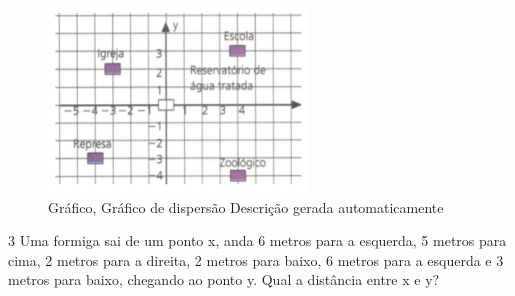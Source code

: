 \begin{escolha}
\begin{boxmedio}
\begin{boxmedio}
{\begin{boxpeq}
\begin{boxpeq}
{\begin{boxpeq}
\begin{boxmedio}
\begin{boxmedio}
\begin{boxpeq}
\begin{boxmedio}
\begin{boxpeq}
\begin{boxpeq}
\begin{boxpeq}
\begin{boxpeq}
\begin{boxmedio}
{\begin{boxmedio}
\begin{boxmedio}
\begin{boxpeq}
\begin{boxmedio}
\begin{boxpeq}
\begin{boxpeq}
\begin{boxpeq}
\begin{escolha}
{\begin{boxmedio}
\begin{boxpeq}
\begin{boxpeq}
\begin{boxpeq}
\begin{boxpeq}
\begin{boxpeq}
\begin{boxmedio}
\begin{boxpeq}
\begin{boxpeq}
\begin{boxpeq}
{\begin{boxpeq}
\begin{boxmedio}
\begin{boxpeq}
\begin{boxpeq}
\begin{boxpeq}
{\begin{boxpeq}
\begin{boxmedio}
{\begin{boxpeq}
\begin{boxpeq}
\begin{boxmedio}
\begin{boxmedio}
\begin{boxpeq}
\begin{boxpeq}
{\begin{boxpeq}
\begin{boxpeq}
\begin{figure}
\centering
\includegraphics[width=2.7in,height=1.92673in]{./_SAEB_9_MAT/media/image165.png}
\caption{Gráfico, Gráfico de dispersão Descrição gerada automaticamente}
\end{figure}


\begin{boxpeq}


\num{3} Uma formiga sai de um ponto x, anda 6 metros para a esquerda, 5
metros para cima, 2 metros para a direita, 2 metros para baixo, 6 metros
para a esquerda e 3 metros para baixo, chegando ao ponto y. Qual a
distância entre x e y?

\begin{boxpeq}


\end{boxpeq}
\end{boxpeq}
\end{boxpeq}
\end{boxpeq}}
\end{boxpeq}
\end{boxpeq}
\end{boxmedio}
\end{boxmedio}
\end{boxpeq}
\end{boxpeq}}
\end{boxmedio}
\end{boxpeq}}
\end{boxpeq}
\end{boxpeq}
\end{boxpeq}
\end{boxmedio}
\end{boxpeq}}
\end{boxpeq}
\end{boxpeq}
\end{boxpeq}
\end{boxmedio}
\end{boxpeq}
\end{boxpeq}
\end{boxpeq}
\end{boxpeq}
\end{boxpeq}
\end{boxmedio}}
\end{escolha}
\end{boxpeq}
\end{boxpeq}
\end{boxpeq}
\end{boxmedio}
\end{boxpeq}
\end{boxmedio}
\end{boxmedio}}
\end{boxmedio}
\end{boxpeq}
\end{boxpeq}
\end{boxpeq}
\end{boxpeq}
\end{boxmedio}
\end{boxpeq}
\end{boxmedio}
\end{boxmedio}
\end{boxpeq}}
\end{boxpeq}
\end{boxpeq}}
\end{boxmedio}
\end{boxmedio}
\end{escolha}
